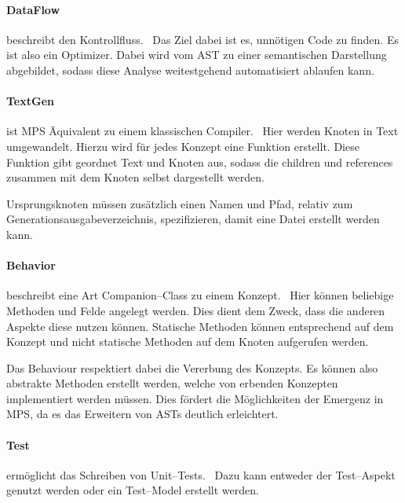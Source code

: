 \paragraph{DataFlow} beschreibt den Kontrollfluss.~\autocite{jetbrains-sro-no-dateS}
Das Ziel dabei ist es, unnötigen Code zu finden.
Es ist also ein Optimizer.
Dabei wird vom \ac{AST} zu einer semantischen Darstellung abgebildet, sodass diese Analyse weitestgehend automatisiert ablaufen kann.

\paragraph{TextGen} ist \ac{MPS} Äquivalent zu einem klassischen Compiler.~\autocite{jetbrains-sro-no-dateT}
Hier werden Knoten in Text umgewandelt.
Hierzu wird für jedes Konzept eine Funktion erstellt.
Diese Funktion gibt geordnet Text und Knoten aus, sodass die {\ttfamily children} und {\ttfamily references} zusammen mit dem Knoten selbst dargestellt werden.

Ursprungsknoten müssen zusätzlich einen Namen und Pfad, relativ zum Generationsausgabeverzeichnis, spezifizieren, damit eine Datei erstellt werden kann.

\paragraph{Behavior} beschreibt eine Art Companion--Class zu einem Konzept.~\autocite{jetbrains-sro-no-dateU}
Hier können beliebige Methoden und Felde angelegt werden.
Dies dient dem Zweck, dass die anderen Aspekte diese nutzen können.
Statische Methoden können entsprechend auf dem Konzept und nicht statische Methoden auf dem Knoten aufgerufen werden.

Das Behaviour respektiert dabei die Vererbung des Konzepts.
Es können also abstrakte Methoden erstellt werden, welche von erbenden Konzepten implementiert werden müssen.
Dies fördert die Möglichkeiten der Emergenz in \ac{MPS}, da es das Erweitern von \acp{AST} deutlich erleichtert.

\paragraph{Test} ermöglicht das Schreiben von Unit--Tests.~\autocite{jetbrains-sro-no-dateE}
Dazu kann entweder der Test--Aspekt genutzt werden oder ein Test--Model erstellt werden.

